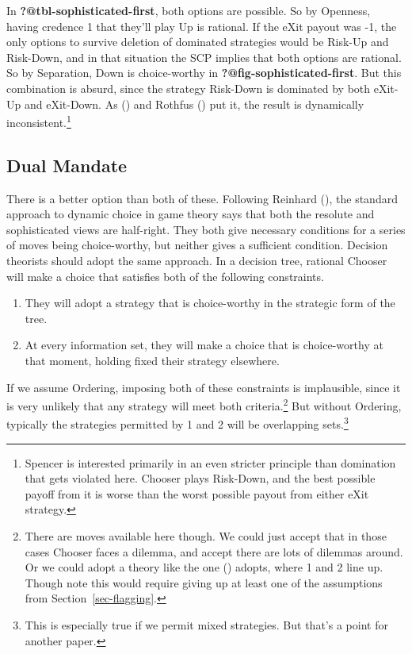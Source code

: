 \documentclass[
  11pt,
  letterpaper,
  DIV=11,
  numbers=noendperiod,
  twoside]{scrartcl}
\providecommand{\tightlist}{%
  \setlength{\itemsep}{0pt}\setlength{\parskip}{0pt}}\usepackage{longtable,booktabs,array}
\begin{document}
In \textbf{?@tbl-sophisticated-first}, both options are possible. So by
Openness, having credence 1 that they'll play Up is rational. If the
eXit payout was -1, the only options to survive deletion of dominated
strategies would be Risk-Up and Risk-Down, and in that situation the SCP
implies that both options are rational. So by Separation, Down is
choice-worthy in \textbf{?@fig-sophisticated-first}. But this
combination is absurd, since the strategy Risk-Down is dominated by both
eXit-Up and eXit-Down. As
() and Rothfus
() put it, the result is
dynamically inconsistent.\footnote{Spencer is interested primarily in an
  even stricter principle than domination that gets violated here.
  Chooser plays Risk-Down, and the best possible payoff from it is worse
  than the worst possible payout from either eXit strategy.}

\subsection{Dual Mandate}\label{sec-dual-mandate-defined}

There is a better option than both of these. Following Reinhard
(), the standard approach
to dynamic choice in game theory says that both the resolute and
sophisticated views are half-right. They both give necessary conditions
for a series of moves being choice-worthy, but neither gives a
sufficient condition. Decision theorists should adopt the same approach.
In a decision tree, rational Chooser will make a choice that satisfies
both of the following constraints.

\begin{enumerate}
\def\labelenumi{\arabic{enumi}.}
\tightlist
\item
  They will adopt a strategy that is choice-worthy in the strategic form
  of the tree.
\item
  At every information set, they will make a choice that is
  choice-worthy at that moment, holding fixed their strategy elsewhere.
\end{enumerate}

If we assume Ordering, imposing both of these constraints is
implausible, since it is very unlikely that any strategy will meet both
criteria.\footnote{There are moves available here though. We could just
  accept that in those cases Chooser faces a dilemma, and accept there
  are lots of dilemmas around. Or we could adopt a theory like the one
  () adopts, where
  1 and 2 line up. Though note this would require giving up at least one
  of the assumptions from Section~\ref{sec-flagging}.} But without
Ordering, typically the strategies permitted by 1 and 2 will be
overlapping sets.\footnote{This is especially true if we permit mixed
  strategies. But that's a point for another paper.}
\end{document}
